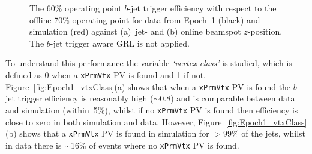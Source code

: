 \begin{figure}[!htb]
  \begin{center}
    \captionsetup[subfigure]{aboveskip=0pt,justification=centering}
  \end{center}
  \vspace{-1em}
  \caption[The $b$-jet trigger efficiency 
    for data from Epoch~1 and simulation against jet-\pT{} and online beamspot $z$-position.
    The $b$-jet trigger aware GRL is not applied.]
          {The 60\% operating point $b$-jet trigger efficiency with respect to the offline 70\% operating point
            for data from Epoch~1 (black) and simulation (red) against (a)~jet-\pT{} and (b) online beamspot $z$-position.
            The $b$-jet trigger aware GRL is not applied.}
          \label{fig:Epoch1_eff}
            \vspace{-0.5em}

\end{figure}

To understand this performance the variable \textit{`vertex class'} is studied, which is defined as 0 when a \verb|xPrmVtx| PV is found and 1 if not.
Figure~\ref{fig:Epoch1_vtxClass}(a) shows that when a \verb|xPrmVtx| PV is found the $b$-jet trigger efficiency is reasonably high ($\sim$0.8)
and is comparable between data and simulation (within~5\%),
whilst if no \verb|xPrmVtx| PV is found then efficiency is close to zero in both simulation and data.
However, Figure~\ref{fig:Epoch1_vtxClass}(b) shows that a \verb|xPrmVtx| PV is found in simulation for $>99$\% of the jets,
whilst in data there is $\sim$16\% of events where no \verb|xPrmVtx| PV is found.


